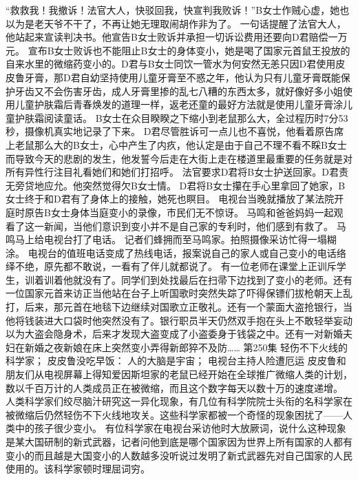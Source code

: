 \documentclass[a4paper,12pt,UTF8,twoside]{ctexbook}
\begin{document}
        “救救我！我撤诉！法官大人，快驳回我，快宣判我败诉！”B女士作贼心虚，她也以为是老天爷不干了，不再让她无理取闹胡作非为了。  
        一句话提醒了法官大人，他站起来宣读判决书。他宣告B女士败诉并承担一切诉讼费用还要向D君赔偿一万元。        
        宣布B女士败诉也不能阻止B女士的身体变小，她是喝了国家元首鼠王投放的自来水里的微缩药变小的。D君与B女士同饮一管水为何安然无恙只因D君使用皮皮鲁牙膏，那D君自幼坚持使用儿童牙膏至不惑之年，他认为只有儿童牙膏既能保护牙齿又不会伤害牙齿，成人牙膏里掺的乱七八糟的东西太多，就好像好多小姐使用儿童护肤霜后青春焕发的道理一样，返老还童的最好方法就是使用儿童牙膏涂儿童护肤霜阅读童话。  
        B女士在众目睽睽之下缩小到老鼠那么大，全过程历时7分53秒，摄像机真实地记录了下来。  
        D君尽管胜诉可一点儿也不喜悦，他看着原告席上老鼠那么大的B女士，心中产生了内疚，他认定是由于自己不理不看不睬B女士而导致今天的悲剧的发生，他发誓今后走在大街上走在楼道里最重要的任务就是对所有异性行注目礼看她们和她们打招呼。  
        法官要求D君将B女士护送回家。D君责无旁贷地应允。他突然觉得欠B女士情。  
        D君将B女士攥在手心里拿回了她家，B女士终于和D君有了身体上的接触，她死也瞑目。  
        电视台当晚就播放了某法院开庭时原告B女士身体当庭变小的录像，市民们无不惊讶。  
        马鸣和爸爸妈妈一起观看了这一新闻，当他们意识到变小并不是自己家的专利时，他们感到有救了。  
        马鸣马上给电视台打了电话。  
        记者们蜂拥而至马鸣家。拍照摄像采访忙得一塌糊涂。  
        电视台的值班电话变成了热线电话，报案说自己的家人或自己变小的电话络绎不绝，原先都不敢说，一看有了伴儿就都说了。  
        有一位老师在课堂上正训斥学生，训着训着他就没有了。同学们到处找最后在扫帚下边找到了变小的老师。还有一位国家元首来访正当他站在台子上听国歌时突然失踪了吓得保镖们拔枪朝天上乱打，后来，那元首在地毯下边继续对国歌立正敬礼。还有一个蒙面大盗抢银行，当他将钱装进大口袋时他突然没有了。银行职员半天仍然双手抱在头上不敢轻举妄动以为大盗会隐身术，后来才发现大盗变成了小盗委身于钱袋之中。还有一对新婚夫妇在新婚之夜新娘在床上突然变小弄得新郎猝不及防……         第250集  
        轻伤不下火线的科学家；  
        皮皮鲁没吃早饭：  
        人的大脑是宇宙；  
        电视台主持人险遭厄运    
        皮皮鲁和朋友们从电视屏幕上得知爱因斯坦家的老鼠已经开始在全球推广微缩人类的计划，数以千百万计的人类成员正在被微缩，而且这个数字每天以数十万的速度递增。  
        人类科学家们绞尽脑汁研究这一异化现象，有几位有科学院院士头衔的名科学家在被微缩后仍然轻伤不下火线地攻关。这些科学家都被一个奇怪的现象困扰了——人类中的孩子很少变小。  
        有位科学家在电视台采访他时大放厥词，说什么这种现象是某大国研制的新式武器，记者问他到底是哪个国家因为世界上所有国家的人都有变小的而且越是大国变小的人数越多没听说过发明了新式武器先对自己国家的人民使用的。该科学家顿时理屈词穷。  
\end{document}
